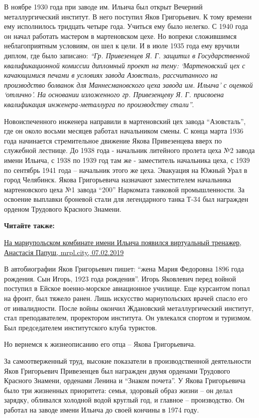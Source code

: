 В ноябре 1930 года при заводе им. Ильича был открыт Вечерний металлургический
институт. В него поступил Яков Григорьевич. К тому времени ему исполнилось
тридцать четыре года. Учиться ему было нелегко. С 1940 года он начал работать
мастером в мартеновском цехе. Но вопреки сложившимся неблагоприятным условиям,
он шел к цели. И в июле 1935 года ему вручили диплом, где было записано: \emph{\enquote{Гр.
Привезенцев Я. Г. защитил в Государственной квалификационной комиссии дипломный
проект на тему: \enquote{Мартеновский цех с качающимися печами в условиях завода
Азовсталь, рассчитанного на производство болванок для Маннесмановского цеха
завода им. Ильича} с оценкой \enquote{отлично}. На основании изложенного гр.
Привезенцеву Я. Г. присвоена квалификация инженера-металлурга по производству
стали}}.

Новоиспеченного инженера направили в мартеновский цех завода \enquote{Азовсталь}, где
он около восьми месяцев работал начальником смены. С конца марта 1936 года
начинается стремительное движение Якова Привезенцева вверх по служебной
лестнице. До 1938 года - начальник литейного пролета цеха №2 завода имени
Ильича, с 1938 по 1939 год там же - заместитель начальника цеха, с 1939 по
сентябрь 1941 года – начальник этого же цеха. Эвакуация на Южный Урал в город
Челябинск. Якова Григорьевича назначают заместителем начальника мартеновского
цеха №1 завода \enquote{200} Наркомата танковой промышленности. За освоение выплавки
броневой стали для легендарного танка Т-34 был награжден орденом Трудового
Красного Знамени.

\textbf{Читайте также:} 

\href{https://mrpl.city/news/view/na-mariupolskom-kombinate-imeni-ilicha-poyavilsya-virtualnyj-trenazher-foto}{%
На мариупольском комбинате имени Ильича появился виртуальный тренажер, Анастасія Папуш, mrpl.city, 07.02.2019}

В автобиографии Яков Григорьевич пишет: \enquote{жена Мария Федоровна 1896 года
рождения. Сын Игорь, 1923 года рождения}. Игорь Яковлевич перед войной поступил
в Ейское военно-морское авиационное училище. Еще курсантом попал на фронт, был
тяжело ранен. Лишь искусство мариупольских врачей спасло его от инвалидности.
После войны окончил Ждановский металлургический институт, стал преподавателем,
проректором института. Он увлекался спортом и туризмом. Был председателем
институтского клуба туристов.

Но вернемся к жизнеописанию его отца – Якова Григорьевича.

За самоотверженный труд, высокие показатели в производственной деятельности
Яков Григорьевич Привезенцев был награжден двумя орденами Трудового Красного
Знамени, орденами Ленина и \enquote{Знаком почета}. У Якова Григорьевича было три
жизненных приоритета: семья, здоровый образ жизни – он делал зарядку, обливался
холодной водой круглый год, и главное – производство. Он работал на заводе
имени Ильича до своей кончины в 1974 году.

